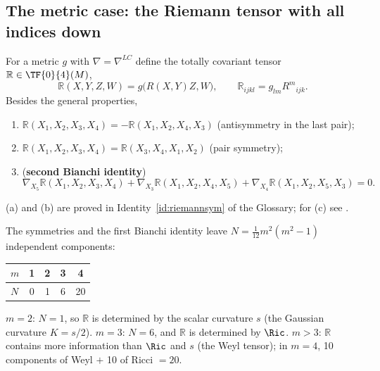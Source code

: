 \subsection{The metric case: the Riemann tensor with all indices down}
\begin{formal}
For a metric $g$ with $\nabla=\nabla^{LC}$ define the totally covariant tensor $\mathbb R\in\TF{0}{4}(M)$,
\[
\mathbb R(X,Y,Z,W)=g\big(R(X,Y)Z,W\big),\qquad \mathbb R_{ijkl}=g_{lm}R^m{}_{ijk}.
\]
Besides the general properties,
\begin{enumerate}[nosep,label=(\alph*)]
\item $\mathbb R(X_1,X_2,X_3,X_4)=-\mathbb R(X_1,X_2,X_4,X_3)$ (antisymmetry in the last pair);
\item $\mathbb R(X_1,X_2,X_3,X_4)=\mathbb R(X_3,X_4,X_1,X_2)$ (pair symmetry);
\item (\textbf{second Bianchi identity}) \[\nabla_{X_5}\mathbb R(X_1,X_2,X_3,X_4)+\nabla_{X_3}\mathbb R(X_1,X_2,X_4,X_5)+\nabla_{X_4}\mathbb R(X_1,X_2,X_5,X_3)=0.\]
\end{enumerate}
(a) and (b) are proved in Identity~\ref{id:riemannsym} of the Glossary; for (c) see \cite{Lee}.%
\end{formal}

\begin{formal}
The symmetries and the first Bianchi identity leave $N=\frac1{12}m^2(m^2-1)$ independent components:
\begin{center}
\begin{tabular}{@{}lcccc@{}}
\toprule
$m$ & 1 & 2 & 3 & 4\\ \midrule
$N$ & 0 & 1 & 6 & 20\\ \bottomrule
\end{tabular}
\end{center}
$m=2$: $N=1$, so $\mathbb R$ is determined by the scalar curvature $s$ (the Gaussian curvature $K=s/2$). $m=3$: $N=6$, and $\mathbb R$ is determined by $\Ric$. $m>3$: $\mathbb R$ contains more information than $\Ric$ and $s$ (the Weyl tensor); in $m=4$, 10 components of Weyl $+$ 10 of Ricci $=20$.
\end{formal}

